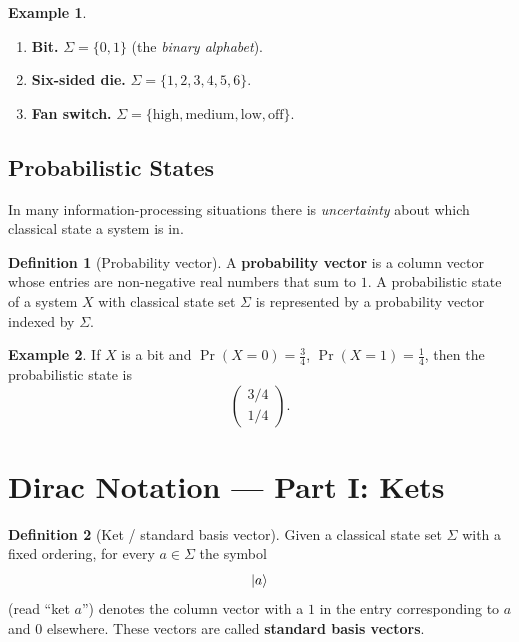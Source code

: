 \documentclass[11pt]{article}
\theoremstyle{definition}
\newtheorem{definition}{Definition}[section]
\newtheorem{example}{Example}[section]
\begin{document}
\begin{example}\leavevmode
\begin{enumerate}
    \item \textbf{Bit.}  $\Sigma = \{0,1\}$ (the \emph{binary alphabet}).
    \item \textbf{Six-sided die.}  $\Sigma = \{1,2,3,4,5,6\}$.
    \item \textbf{Fan switch.}  $\Sigma = \{\text{high}, \text{medium}, \text{low}, \text{off}\}$.
\end{enumerate}
\end{example}

\subsection{Probabilistic States}

In many information-processing situations there is \emph{uncertainty} about which classical state a system is in.

\begin{definition}[Probability vector]
A \textbf{probability vector} is a column vector whose entries are non-negative real numbers that sum to $1$.  A probabilistic state of a system $X$ with classical state set $\Sigma$ is represented by a probability vector indexed by $\Sigma$.
\end{definition}

\begin{example}
If $X$ is a bit and $\Pr(X=0)=\tfrac{3}{4}$, $\Pr(X=1)=\tfrac{1}{4}$, then the probabilistic state is
\[
    \begin{pmatrix} 3/4 \\ 1/4 \end{pmatrix}.
\]
\end{example}

\section{Dirac Notation --- Part I: Kets}

\begin{definition}[Ket / standard basis vector]
Given a classical state set $\Sigma$ with a fixed ordering, for every $a\in\Sigma$ the symbol
\[
    \ket{a}
\]
(read ``ket $a$'') denotes the column vector with a $1$ in the entry corresponding to $a$ and $0$ elsewhere.  These vectors are called \textbf{standard basis vectors}.
\end{definition}
\end{document}
